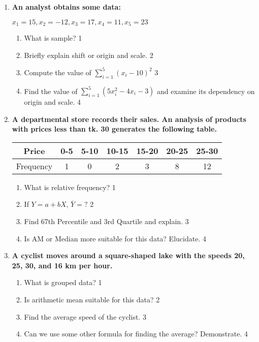 \documentclass{article}
\begin{document}
  \begin{enumerate}

   \item
	  \textbf{An analyst obtains some data:}
	  \begin{center}
	  $x_1=15, x_2=-12, x_3=17, x_4=11, x_5=23$
  \end{center}
  \begin{enumerate}
    \item
	What is sample? \hfill 1
    \item
	Briefly explain shift or origin and scale. \hfill 2
    \item  
	Compute the value of $\displaystyle \sum_{i=1}^5 (x_i-10)^2$ \hfill 3
    \item
	Find the value of $\displaystyle \sum_{i=1}^5 (5x_i^2-4x_i-3)$ and examine its dependency on origin and scale. \hfill 4
  \end{enumerate}
  
       \item
	  \textbf{A departmental store records their sales. An analysis of products with prices less than tk. 30 generates the following table.} 
	  
\begin{table}[h]
\centering
\begin{tabular}{c|c|c|c|c|c|c}
Price     & 0-5 & 5-10 & 10-15 & 15-20 & 20-25 & 25-30 \\ \hline
Frequency & 1   & 0    & 2     & 3     & 8     & 12   
\end{tabular}
\end{table}
  
  \begin{enumerate}
    \item
	What is relative frequency? \hfill 1
    \item
	If $Y = a + bX$, $\bar Y = ?$ \hfill 2
    \item  
	Find 67th Percentile and 3rd Quartile and explain. \hfill 3
    \item
	Is AM or Median more suitable for this data? Elucidate. \hfill 4
  \end{enumerate}
  
   \item
	  \textbf{A cyclist moves around a square-shaped lake with the speeds 20, 25, 30, and 16 km per hour.} 
  
  \begin{enumerate}
    \item
	What is grouped data? \hfill 1
    \item
	Is arithmetic mean suitable for this data? \hfill 2
    \item  
	Find the average speed of the cyclist. \hfill 3
    \item
	Can we use some other formula for finding the average? Demonstrate. \hfill 4
  \end{enumerate}


\end{enumerate}
\end{document}
